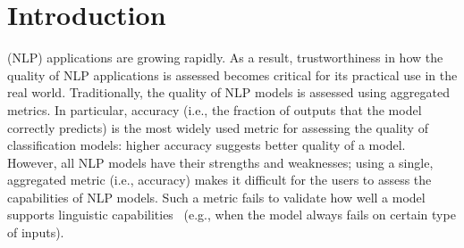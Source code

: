 \section{Introduction}
\label{sec:intro}



\Nlp (NLP) applications are growing rapidly.  As a result,
trustworthiness in how the quality of NLP applications is assessed
becomes critical for its practical use in the real world.
Traditionally, the quality of NLP models is assessed using aggregated
metrics. In particular, accuracy (i.e., the fraction of outputs that
the model correctly predicts) is the most widely used metric for
assessing the quality of classification models: higher accuracy
suggests better quality of a model.  However, all NLP models have
their strengths and weaknesses; using a single, aggregated metric
(i.e., accuracy) makes it difficult for the users to assess the
capabilities of NLP models.  Such a metric fails to validate how well
a model supports linguistic
capabilities~\cite{geva2019we,gururangan2018annotation} (e.g., when
the model always fails on certain type of inputs).

